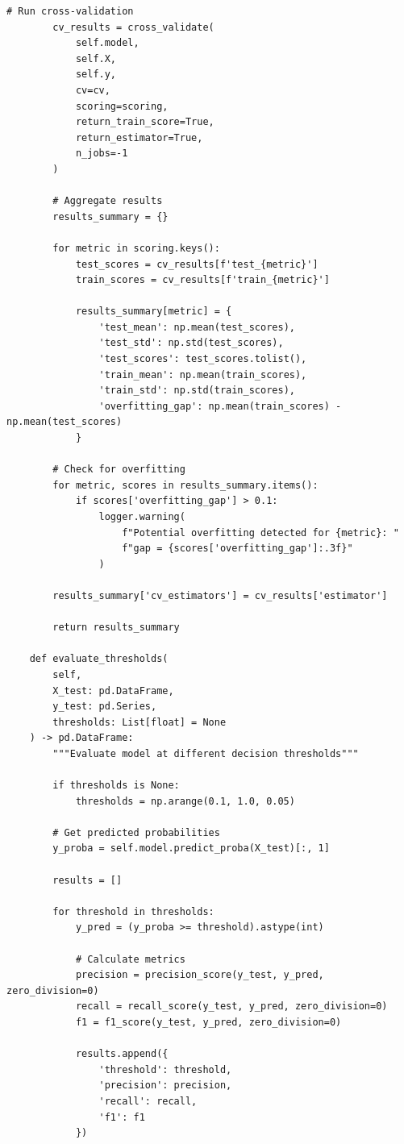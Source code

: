 \begin{lstlisting}[style=python, caption=Production Model Validation Framework]
        # Run cross-validation
        cv_results = cross_validate(
            self.model,
            self.X,
            self.y,
            cv=cv,
            scoring=scoring,
            return_train_score=True,
            return_estimator=True,
            n_jobs=-1
        )

        # Aggregate results
        results_summary = {}

        for metric in scoring.keys():
            test_scores = cv_results[f'test_{metric}']
            train_scores = cv_results[f'train_{metric}']

            results_summary[metric] = {
                'test_mean': np.mean(test_scores),
                'test_std': np.std(test_scores),
                'test_scores': test_scores.tolist(),
                'train_mean': np.mean(train_scores),
                'train_std': np.std(train_scores),
                'overfitting_gap': np.mean(train_scores) - np.mean(test_scores)
            }

        # Check for overfitting
        for metric, scores in results_summary.items():
            if scores['overfitting_gap'] > 0.1:
                logger.warning(
                    f"Potential overfitting detected for {metric}: "
                    f"gap = {scores['overfitting_gap']:.3f}"
                )

        results_summary['cv_estimators'] = cv_results['estimator']

        return results_summary

    def evaluate_thresholds(
        self,
        X_test: pd.DataFrame,
        y_test: pd.Series,
        thresholds: List[float] = None
    ) -> pd.DataFrame:
        """Evaluate model at different decision thresholds"""

        if thresholds is None:
            thresholds = np.arange(0.1, 1.0, 0.05)

        # Get predicted probabilities
        y_proba = self.model.predict_proba(X_test)[:, 1]

        results = []

        for threshold in thresholds:
            y_pred = (y_proba >= threshold).astype(int)

            # Calculate metrics
            precision = precision_score(y_test, y_pred, zero_division=0)
            recall = recall_score(y_test, y_pred, zero_division=0)
            f1 = f1_score(y_test, y_pred, zero_division=0)

            results.append({
                'threshold': threshold,
                'precision': precision,
                'recall': recall,
                'f1': f1
            })


\end{lstlisting}
